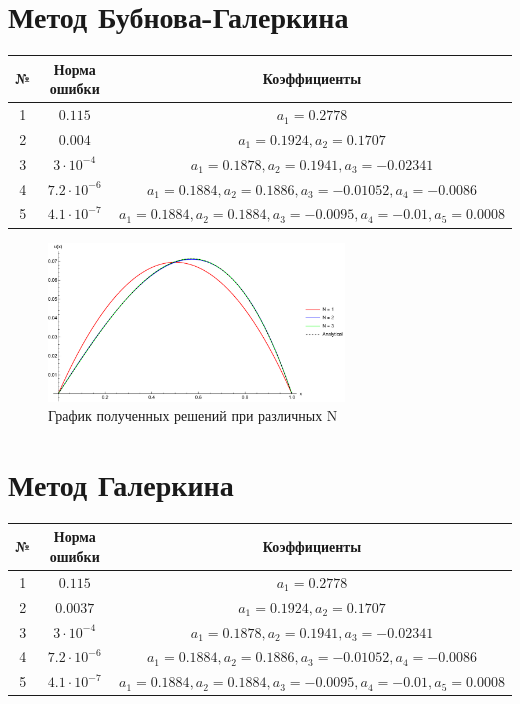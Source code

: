 \documentclass[12pt,a4paper]{article}
\begin{document}
    \section{ Метод Бубнова-Галеркина}

    \begin{center}
        \begin{tabular}{|c|c|c|} 
         \hline
         № & Норма ошибки & Коэффициенты \\ 
         \hline
         1 & $0.115$ & $a_1=0.2778$ \\ 
         \hline
         2 & $0.004$ & $a_1=0.1924, a_2=0.1707$ \\ 
         \hline
         3 & $3\cdot10^{-4}$ & $a_1=0.1878, a_2=0.1941, a_3=-0.02341$ \\ 
         \hline
         4 & $7.2\cdot10^{-6}$ & $a_1=0.1884, a_2=0.1886, a_3=-0.01052, a_4=-0.0086$ \\ 
         \hline
         5 & $4.1\cdot10^{-7}$ & $a_1=0.1884, a_2=0.1884, a_3=-0.0095, a_4=-0.01, a_5=0.0008$ \\ 
         \hline
        \end{tabular}
    \end{center}

    \begin{figure}[h]
        \centering
        \includegraphics[width=0.7\textwidth]{3.pdf}
        \caption{График полученных решений при различных N}
    \end{figure}

    \section{ Метод Галеркина}

    \begin{center}
        \begin{tabular}{|c|c|c|} 
         \hline
         № & Норма ошибки & Коэффициенты \\ 
         \hline
         1 & $0.115$ & $a_1=0.2778$ \\ 
         \hline
         2 & $0.0037$ & $a_1=0.1924, a_2=0.1707$ \\ 
         \hline
         3 & $3\cdot10^{-4}$ & $a_1=0.1878, a_2=0.1941, a_3=-0.02341$ \\ 
         \hline
         4 & $7.2\cdot10^{-6}$ & $a_1=0.1884, a_2=0.1886, a_3=-0.01052, a_4=-0.0086$ \\ 
         \hline
         5 & $4.1\cdot10^{-7}$ & $a_1=0.1884, a_2=0.1884, a_3=-0.0095, a_4=-0.01, a_5=0.0008$ \\ 
         \hline
        \end{tabular}
    \end{center}
\end{document}
